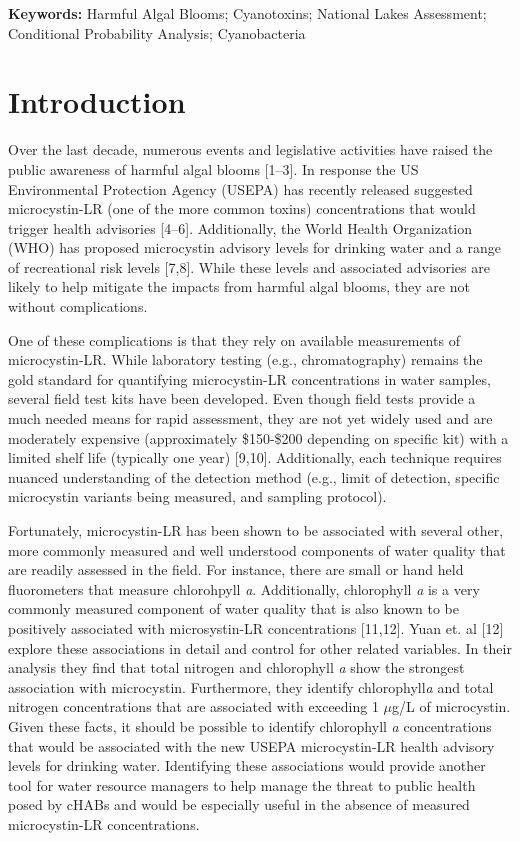 \documentclass[10pt,a4paper,twocolumn]{article}
\begin{document}
\textbf{Keywords: }
Harmful Algal Blooms;
Cyanotoxins;
National Lakes Assessment;
Conditional Probability Analysis;
Cyanobacteria

\clearpage

\section{Introduction}\label{introduction}

Over the last decade, numerous events and legislative activities have
raised the public awareness of harmful algal blooms {[}1--3{]}. In
response the US Environmental Protection Agency (USEPA) has recently
released suggested microcystin-LR (one of the more common toxins)
concentrations that would trigger health advisories {[}4--6{]}.
Additionally, the World Health Organization (WHO) has proposed
microcystin advisory levels for drinking water and a range of
recreational risk levels {[}7,8{]}. While these levels and associated
advisories are likely to help mitigate the impacts from harmful algal
blooms, they are not without complications.

One of these complications is that they rely on available measurements
of microcystin-LR. While laboratory testing (e.g., chromatography)
remains the gold standard for quantifying microcystin-LR concentrations
in water samples, several field test kits have been developed. Even
though field tests provide a much needed means for rapid assessment,
they are not yet widely used and are moderately expensive (approximately
\$150-\$200 depending on specific kit) with a limited shelf life
(typically one year) {[}9,10{]}. Additionally, each technique requires
nuanced understanding of the detection method (e.g., limit of detection,
specific microcystin variants being measured, and sampling protocol).

Fortunately, microcystin-LR has been shown to be associated with several
other, more commonly measured and well understood components of water
quality that are readily assessed in the field. For instance, there are
small or hand held fluorometers that measure chlorohpyll \emph{a}.
Additionally, chlorophyll \emph{a} is a very commonly measured component
of water quality that is also known to be positively associated with
microsystin-LR concentrations {[}11,12{]}. Yuan et. al {[}12{]} explore
these associations in detail and control for other related variables. In
their analysis they find that total nitrogen and chlorophyll \emph{a}
show the strongest association with microcystin. Furthermore, they
identify chlorophyll\emph{a} and total nitrogen concentrations that are
associated with exceeding 1 \(\mu\)g/L of microcystin. Given these
facts, it should be possible to identify chlorophyll \emph{a}
concentrations that would be associated with the new USEPA
microcystin-LR health advisory levels for drinking water. Identifying
these associations would provide another tool for water resource
managers to help manage the threat to public health posed by cHABs and
would be especially useful in the absence of measured microcystin-LR
concentrations.
\end{document}
